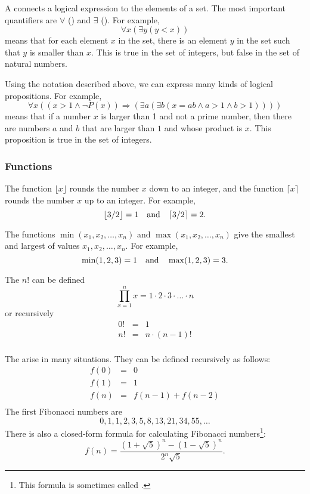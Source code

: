 
A  connects a logical expression
to the elements of a set.
The most important quantifiers are
$\forall$ () and $\exists$ ().
For example,
\[\forall x (\exists y (y < x))\]
means that for each element $x$ in the set,
there is an element $y$ in the set
such that $y$ is smaller than $x$.
This is true in the set of integers,
but false in the set of natural numbers.

Using the notation described above,
we can express many kinds of logical propositions.
For example,
\[\forall x ((x>1 \land \lnot P(x)) \Rightarrow (\exists a (\exists b (x = ab \land a > 1 \land b > 1))))\]
means that if a number $x$ is larger than 1
and not a prime number,
then there are numbers $a$ and $b$
that are larger than $1$ and whose product is $x$.
This proposition is true in the set of integers.

\subsubsection{Functions}

The function $\lfloor x \rfloor$ rounds the number $x$
down to an integer, and the function
$\lceil x \rceil$ rounds the number $x$
up to an integer. For example,
\[ \lfloor 3/2 \rfloor = 1 \hspace{10px} \textrm{and} \hspace{10px} \lceil 3/2 \rceil = 2.\]

The functions $\min(x_1,x_2,\ldots,x_n)$
and $\max(x_1,x_2,\ldots,x_n)$
give the smallest and largest of values
$x_1,x_2,\ldots,x_n$.
For example,
\[ \min(1,2,3)=1 \hspace{10px} \textrm{and} \hspace{10px} \max(1,2,3)=3.\]


The  $n!$ can be defined
\[\prod_{x=1}^n x = 1 \cdot 2 \cdot 3 \cdot \ldots \cdot n\]
or recursively
\[
\begin{array}{lcl}
0! & = & 1 \\
n! & = & n \cdot (n-1)! \\
\end{array}
\]


The 
arise in many situations.
They can be defined recursively as follows:
\[
\begin{array}{lcl}
f(0) & = & 0 \\
f(1) & = & 1 \\
f(n) & = & f(n-1)+f(n-2) \\
\end{array}
\]
The first Fibonacci numbers are
\[0, 1, 1, 2, 3, 5, 8, 13, 21, 34, 55, \ldots\]
There is also a closed-form formula
for calculating Fibonacci numbers\footnote{This formula is sometimes called
 .}:
\[f(n)=\frac{(1 + \sqrt{5})^n - (1-\sqrt{5})^n}{2^n \sqrt{5}}.\]

